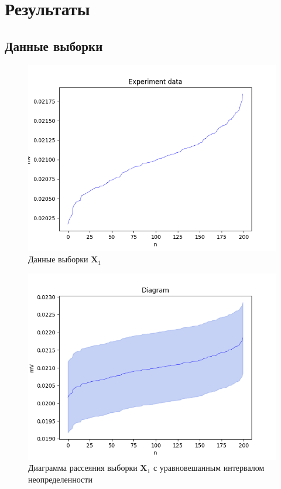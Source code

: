 \section{Результаты}

\subsection{Данные выборки}

\begin{figure}[H]
	\begin{center}
		\includegraphics[scale = 0.55]{resources/data.png}
	\end{center}
	\caption{Данные выборки $\bm{X}_1$}
\end{figure}

\begin{figure}[H]
	\begin{center}
		\includegraphics[scale = 0.55]{resources/diagram_beta_None.png}
	\end{center}
	\caption{Диаграмма рассеяния выборки $\bm{X}_1$ с уравновешанным интервалом неопределенности}
\end{figure}

